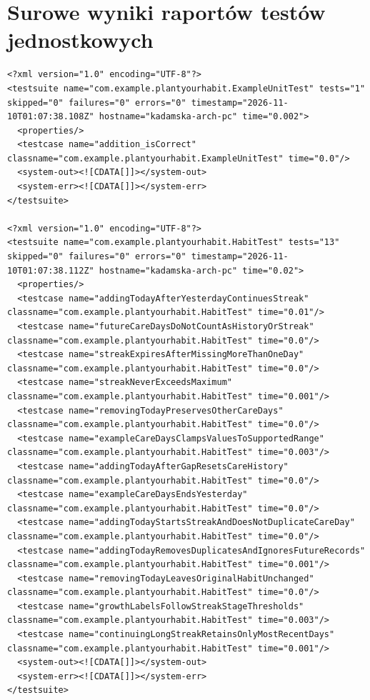 \documentclass[a4paper,12pt]{article}
\begin{document}
\section{Surowe wyniki raportów testów jednostkowych}
\begin{verbatim}
<?xml version="1.0" encoding="UTF-8"?>
<testsuite name="com.example.plantyourhabit.ExampleUnitTest" tests="1" skipped="0" failures="0" errors="0" timestamp="2026-11-10T01:07:38.108Z" hostname="kadamska-arch-pc" time="0.002">
  <properties/>
  <testcase name="addition_isCorrect" classname="com.example.plantyourhabit.ExampleUnitTest" time="0.0"/>
  <system-out><![CDATA[]]></system-out>
  <system-err><![CDATA[]]></system-err>
</testsuite>

<?xml version="1.0" encoding="UTF-8"?>
<testsuite name="com.example.plantyourhabit.HabitTest" tests="13" skipped="0" failures="0" errors="0" timestamp="2026-11-10T01:07:38.112Z" hostname="kadamska-arch-pc" time="0.02">
  <properties/>
  <testcase name="addingTodayAfterYesterdayContinuesStreak" classname="com.example.plantyourhabit.HabitTest" time="0.01"/>
  <testcase name="futureCareDaysDoNotCountAsHistoryOrStreak" classname="com.example.plantyourhabit.HabitTest" time="0.0"/>
  <testcase name="streakExpiresAfterMissingMoreThanOneDay" classname="com.example.plantyourhabit.HabitTest" time="0.0"/>
  <testcase name="streakNeverExceedsMaximum" classname="com.example.plantyourhabit.HabitTest" time="0.001"/>
  <testcase name="removingTodayPreservesOtherCareDays" classname="com.example.plantyourhabit.HabitTest" time="0.0"/>
  <testcase name="exampleCareDaysClampsValuesToSupportedRange" classname="com.example.plantyourhabit.HabitTest" time="0.003"/>
  <testcase name="addingTodayAfterGapResetsCareHistory" classname="com.example.plantyourhabit.HabitTest" time="0.0"/>
  <testcase name="exampleCareDaysEndsYesterday" classname="com.example.plantyourhabit.HabitTest" time="0.0"/>
  <testcase name="addingTodayStartsStreakAndDoesNotDuplicateCareDay" classname="com.example.plantyourhabit.HabitTest" time="0.0"/>
  <testcase name="addingTodayRemovesDuplicatesAndIgnoresFutureRecords" classname="com.example.plantyourhabit.HabitTest" time="0.001"/>
  <testcase name="removingTodayLeavesOriginalHabitUnchanged" classname="com.example.plantyourhabit.HabitTest" time="0.0"/>
  <testcase name="growthLabelsFollowStreakStageThresholds" classname="com.example.plantyourhabit.HabitTest" time="0.003"/>
  <testcase name="continuingLongStreakRetainsOnlyMostRecentDays" classname="com.example.plantyourhabit.HabitTest" time="0.001"/>
  <system-out><![CDATA[]]></system-out>
  <system-err><![CDATA[]]></system-err>
</testsuite>


\end{verbatim}
\end{document}
